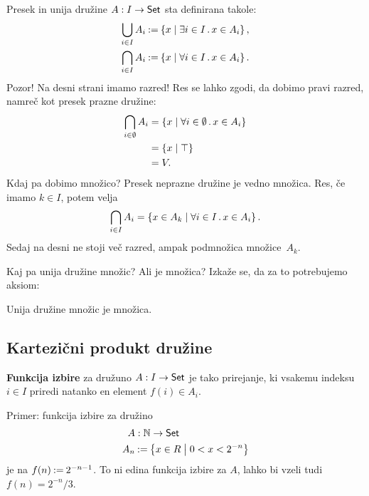 Presek in unija družine $A : I \to \mathsf{Set}$ sta definirana takole:
%
\begin{align*}
  \bigcup_{i \in I} A_i &\mathbin{{:}{=}} \left\{ x \; \middle| \; \exists i \in I \,.\, x \in A_i \right\},
  \\
  \bigcap_{i \in I} A_i &\mathbin{{:}{=}} \left\{ x \; \middle| \; \forall  i \in I \,.\, x \in A_i \right\}.
\end{align*}
%
Pozor! Na desni strani imamo razred! Res se lahko zgodi, da dobimo pravi razred, namreč
kot presek prazne družine:
%
\begin{align*}
  \bigcap_{i \in \emptyset} A_i
  &= \left\{ x \; \middle| \; \forall  i \in \emptyset \,.\, x \in A_i \right\} \\
  &= \left\{ x \; \middle| \; \top \right\} \\
  &= V.
\end{align*}
%
Kdaj pa dobimo množico? Presek neprazne družine je vedno množica. Res, če imamo
$k \in I$, potem velja
%
\begin{equation*}
    \bigcap_{i \in I} A_i = \left\{ x \in A_k \; \middle| \; \forall i \in I \,.\, x \in A_i\right\}.
\end{equation*}
%
Sedaj na desni ne stoji več razred, ampak podmnožica množice~$A_k$.

Kaj pa unija družine množic? Ali je množica? Izkaže se, da za to potrebujemo aksiom:

\begin{aksiom}
  Unija družine množic je množica.
\end{aksiom}


\subsection{Kartezični produkt družine}

\begin{definicija}
  \textbf{Funkcija izbire} za družuno $A : I \to \mathsf{Set}$ je tako prirejanje, ki vsakemu indeksu $i \in I$ priredi natanko en element $f(i) \in A_i$.
 \end{definicija}

 \begin{primer}
   Primer: funkcija izbire za družino
   \begin{align*}
   A &: \mathbb{N} \to \mathsf{Set} \\
   A_n &\mathbin{{:}{=}} \left\{ x \in R \; \middle| \; 0 < x < 2^{-n} \right\}
   \end{align*}
   je na $f(n) \mathbin{{:}{=}} 2^{-n - 1}$. To ni edina funkcija izbire za $A$, lahko bi vzeli tudi $f(n) = 2^{-n} / 3$.
 \end{primer}

